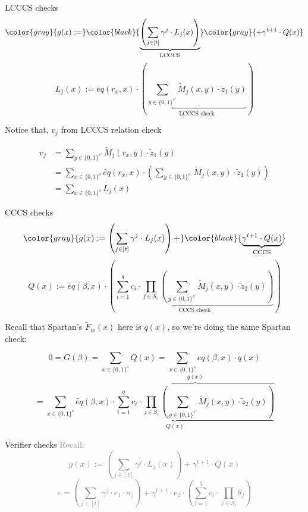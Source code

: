 \documentclass{beamer}
\begin{document}
\begin{tiny}
\begin{frame}{LCCCS checks}
$$
\color{gray}{g(x) :=}
\color{black}{\underbrace{\left( \sum_{j \in [t]} \gamma^j \cdot L_j(x) \right)}_\text{LCCCS} }
\color{gray}{+ \gamma^{t+1} \cdot Q(x)}
$$
$$
L_j(x) := \widetilde{eq}(r_x, x) \cdot \left(
\underbrace{\sum_{y \in \{0,1\}^{s'}} \widetilde{M}_j(x, y) \cdot \widetilde{z}_1(y)}_\text{LCCCS check}
\right)
$$


Notice that, $v_j$ from LCCCS relation check

\begin{align*}
v_j &= \sum_{y \in \{0,1\}^{s'}} \widetilde{M}_j(r_x, y) \cdot \widetilde{z}_1(y)\\
    &= \sum_{x \in \{0,1\}^s}
	  \widetilde{eq}(r_x, x) \cdot \left( \sum_{y \in \{0,1\}^{s'}} \widetilde{M}_j(x, y) \cdot \widetilde{z}_1(y) \right)\\
    &= \sum_{x \in \{0,1\}^s} L_j(x)
\end{align*}
  
\end{frame}
\begin{frame}{CCCS checks}
  $$
  \color{gray}{g(x) := \left( \sum_{j \in [t]} \gamma^j \cdot L_j(x) \right) +}
  \color{black}{\underbrace{\gamma^{t+1} \cdot Q(x)}_\text{CCCS}}
  $$
$$Q(x) := \widetilde{eq}(\beta, x) \cdot \left(
                    \underbrace{ \sum_{i=1}^q c_i \cdot \prod_{j \in S_i} \left( \sum_{y \in \{0, 1\}^{s'}} \widetilde{M}_j(x, y) \cdot \widetilde{z}_2(y) \right) }_\text{CCCS check}
            \right)$$
  
  Recall that Spartan's $\widetilde{F}_{io}(x)$ here is $q(x)$, so we're doing the same Spartan check:
  
$$
0 =G(\beta) = \sum_{x \in \{0,1\}^s} Q(x) = \sum_{x \in \{0,1\}^s} eq(\beta, x) \cdot q(x)$$
$$= \sum_{x \in \{0,1\}^s}
 \underbrace{\widetilde{eq}(\beta , x) \cdot
         \overbrace{
                \sum_{i=1}^q c_i \cdot \prod_{j \in S_i} \left( \sum_{y \in \{0, 1\}^{s'}} \widetilde{M}_j(x, y) \cdot \widetilde{z}_2(y) \right)
        }^{q(x)}
}_{Q(x)}
$$

\end{frame}


\begin{frame}{Verifier checks}
  \textcolor{gray}{
Recall:
$$g(x) := \left( \sum_{j \in [t]} \gamma^j \cdot L_j(x) \right) + \gamma^{t+1} \cdot Q(x)$$
$$c = \left(\sum_{j \in [t]} \gamma^j \cdot e_1 \cdot \sigma_j \right) + \gamma^{t+1} \cdot e_2 \cdot \left( \sum_{i=1}^q c_i \cdot \prod_{j \in S_i} \theta_j \right)$$
}


\end{frame}
\end{tiny}
\end{document}
